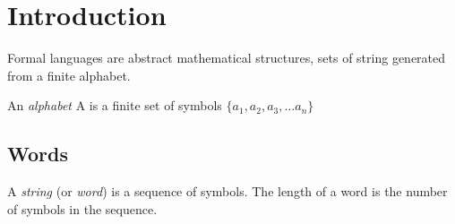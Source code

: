 \section{Introduction}

\newcommand{\alphabetSymbol}{A}
\newcommand{\alphabet}{\alphabetSymbol}
\newcommand{\alphabetpow}[1]{\alphabetSymbol^{#1}}

\newcommand{\languagesymbol}{L}
\newcommand{\languagei}[1]{\languagesymbol_{#1}}

\newcommand{\pow}[2]{#1^{#2}}
\newcommand{\close}[2]{\pow{#1}{(#2)}}

\newcommand{\languagepow}[1]{\pow{\languagesymbol}{#1}}
\newcommand{\languageclose}[1]{\close{\languagesymbol}{#1}}



\newcommand{\wordsymbol}{w}
\newcommand{\wordi}[1]{\wordsymbol_{#1}}
\newcommand{\emptyword}{\epsilon}

\newcommand{\lenghtfunc}[1]{\text{len}(#1)}

\newcommand{\concatop}{\cdot}

\newcommand{\suchthat}{~ | ~}

\newcommand{\languagefunctionsym}{f}
\newcommand{\languagefunc}[1]{\languagefunctionsym_{#1}}
\newcommand{\languagefunci}[1]{\languagefunctionsym_{\languagei{#1}}}


\newcommand{\emptylist}{[\emptyset]}
\newcommand{\unitlist}{[\emptyword]}
\newcommand{\unitlang}{\{\emptyword\}}

\newcommand{\setof}[1]{\{#1\}}

\newcommand{\nats}{\mathbb{N}}
\newcommand{\ints}{\mathbb{Z}}
\newcommand{\reals}{\mathbb{R}}

\newcommand{\regex}{r}
\newcommand{\regexsetsym}{R}
\newcommand{\regexsetl}{\regexsetsym_{\languagei{1}, \languagei{2}}}

Formal languages are abstract mathematical structures, sets of string generated from a finite alphabet. 

\begin{definition}[Alphabet]
	An \emph{alphabet} \alphabet{} is a finite set of symbols $\{a_1, a_2, a_3, \ldots a_n\}$
\end{definition}

\subsection{Words}

\begin{definition}[Words]
	A \emph{string} (or \emph{word}) is a sequence of symbols. The length of a word is the number of symbols in the sequence.
\end{definition}

